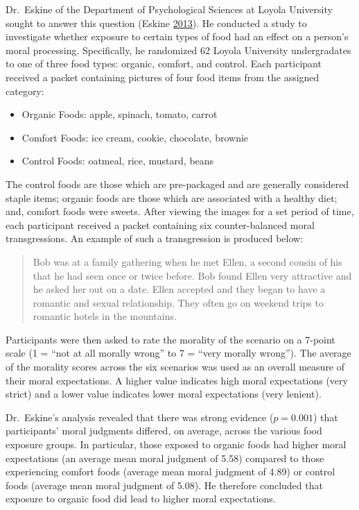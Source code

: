 \documentclass[]{book}
\providecommand{\tightlist}{%
  \setlength{\itemsep}{0pt}\setlength{\parskip}{0pt}}
\theoremstyle{definition}
\theoremstyle{definition}
\theoremstyle{remark}
\begin{document}
Dr.~Eskine of the Department of Psychological Sciences at Loyola
University sought to answer this question (Eskine
\protect\hyperlink{ref-Eskine2013}{2013}). He conducted a study to
investigate whether exposure to certain types of food had an effect on a
person's moral processing. Specifically, he randomized 62 Loyola
University undergradates to one of three food types: organic, comfort,
and control. Each participant received a packet containing pictures of
four food items from the assigned category:

\begin{itemize}
\tightlist
\item
  Organic Foods: apple, spinach, tomato, carrot
\item
  Comfort Foods: ice cream, cookie, chocolate, brownie
\item
  Control Foods: oatmeal, rice, mustard, beans
\end{itemize}

The control foods are those which are pre-packaged and are generally
considered staple items; organic foods are those which are associated
with a healthy diet; and, comfort foods were sweets. After viewing the
images for a set period of time, each participant received a packet
containing six counter-balanced moral transgressions. An example of such
a transgression is produced below:

\begin{quote}
Bob was at a family gathering when he met Ellen, a second cousin of his
that he had seen once or twice before. Bob found Ellen very attractive
and he asked her out on a date. Ellen accepted and they began to have a
romantic and sexual relationship. They often go on weekend trips to
romantic hotels in the mountains.
\end{quote}

Participants were then asked to rate the morality of the scenario on a
7-point scale (1 = ``not at all morally wrong'' to 7 = ``very morally
wrong''). The average of the morality scores across the six scenarios
was used as an overall measure of their moral expectations. A higher
value indicates high moral expectations (very strict) and a lower value
indicates lower moral expectations (very lenient).

Dr.~Eskine's analysis revealed that there was strong evidence
(\(p = 0.001\)) that participants' moral judgments differed, on average,
across the various food exposure groups. In particular, those exposed to
organic foods had higher moral expectations (an average mean moral
judgment of 5.58) compared to those experiencing comfort foods (average
mean moral judgment of 4.89) or control foods (average mean moral
judgment of 5.08). He therefore concluded that exposure to organic food
did lead to higher moral expectations.
\end{document}
